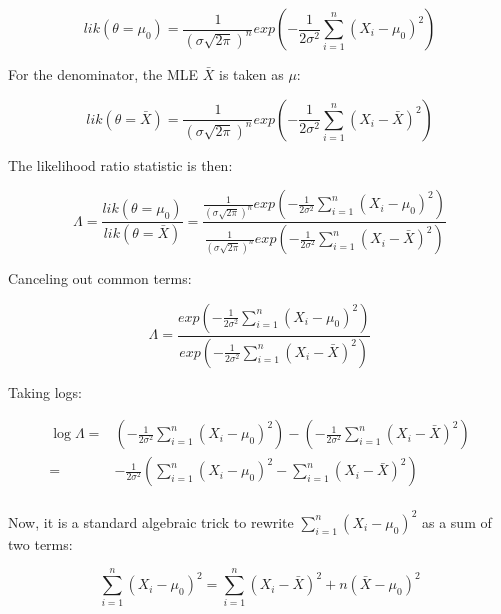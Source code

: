 \documentclass[12pt,]{krantz}
\begin{document}
\begin{equation}
lik(\theta=\mu_0) = \frac{1}{(\sigma\sqrt{2\pi})^n} 
           exp\left( -\frac{1}{2\sigma^2} \sum_{i=1}^n (X_i - \mu_0)^2  \right)
\end{equation}

For the denominator, the MLE \(\bar{X}\) is taken as \(\mu\):

\begin{equation}
lik(\theta=\bar{X}) =\frac{1}{(\sigma\sqrt{2\pi})^n} exp \left( -\frac{1}{2\sigma^2} \sum_{i=1}^n (X_i - \bar{X})^2 \right)
\end{equation}

The likelihood ratio statistic is then:

\begin{equation}
\Lambda = \frac{lik(\theta=\mu_0)}{lik(\theta=\bar{X})}=
\frac{\frac{1}{(\sigma\sqrt{2\pi})^n} 
           exp\left( -\frac{1}{2\sigma^2} \sum_{i=1}^n (X_i - \mu_0)^2  \right)}{\frac{1}{(\sigma\sqrt{2\pi})^n} 
           exp\left( -\frac{1}{2\sigma^2} \sum_{i=1}^n (X_i - \bar{X})^2  \right)}
\end{equation}

Canceling out common terms:

\begin{equation}
\Lambda = 
\frac{exp\left( -\frac{1}{2\sigma^2} \sum_{i=1}^n (X_i - \mu_0)^2  \right)}{
        exp\left( -\frac{1}{2\sigma^2} \sum_{i=1}^n (X_i - \bar{X})^2  \right)}
\end{equation}

Taking logs:

\begin{equation}
\begin{split}
\log \Lambda =& 
\left( -\frac{1}{2\sigma^2} \sum_{i=1}^n (X_i - \mu_0)^2  \right)-\left( -\frac{1}{2\sigma^2} \sum_{i=1}^n (X_i - \bar{X})^2  \right)\\
=& -\frac{1}{2\sigma^2} \left( \sum_{i=1}^n (X_i - \mu_0)^2  -  \sum_{i=1}^n (X_i - \bar{X})^2 \right)\\
\end{split}
\end{equation}

Now, it is a standard algebraic trick to rewrite \(\sum_{i=1}^n (X_i -\mu_0)^2\) as a sum of two terms:

\begin{equation}
\sum_{i=1}^n (X_i -\mu_0)^2 = \sum_{i=1}^n (X_i - \bar{X})^2 + n(\bar{X} - \mu_0)^2 
\end{equation}
\end{document}
